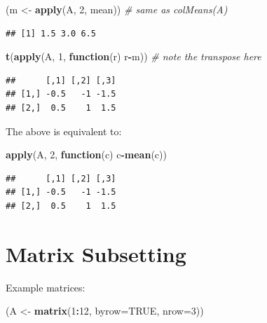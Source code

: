 \documentclass[10pt,b5paper,krantz1]{krantz}
\newenvironment{Shaded}{\begin{snugshade}}{\end{snugshade}}
\newcommand{\CommentTok}[1]{\textcolor[rgb]{0.37,0.37,0.37}{\textit{#1}}}
\newcommand{\ControlFlowTok}[1]{\textcolor[rgb]{0.27,0.27,0.27}{\textbf{#1}}}
\newcommand{\DataTypeTok}[1]{\textcolor[rgb]{0.27,0.27,0.27}{#1}}
\newcommand{\DecValTok}[1]{\textcolor[rgb]{0.06,0.06,0.06}{#1}}
\newcommand{\KeywordTok}[1]{\textcolor[rgb]{0.27,0.27,0.27}{\textbf{#1}}}
\newcommand{\NormalTok}[1]{#1}
\newcommand{\OperatorTok}[1]{\textcolor[rgb]{0.43,0.43,0.43}{\textbf{#1}}}
\newcommand{\OtherTok}[1]{\textcolor[rgb]{0.37,0.37,0.37}{#1}}
\newcommand{\StringTok}[1]{\textcolor[rgb]{0.5,0.5,0.5}{#1}}
\begin{document}
\begin{Shaded}
\begin{Highlighting}[]
\NormalTok{(m <-}\StringTok{ }\KeywordTok{apply}\NormalTok{(A, }\DecValTok{2}\NormalTok{, mean)) }\CommentTok{# same as colMeans(A)}
\end{Highlighting}
\end{Shaded}

\begin{verbatim}
## [1] 1.5 3.0 6.5
\end{verbatim}

\begin{Shaded}
\begin{Highlighting}[]
\KeywordTok{t}\NormalTok{(}\KeywordTok{apply}\NormalTok{(A, }\DecValTok{1}\NormalTok{, }\ControlFlowTok{function}\NormalTok{(r) r}\OperatorTok{-}\NormalTok{m)) }\CommentTok{# note the transpose here}
\end{Highlighting}
\end{Shaded}

\begin{verbatim}
##      [,1] [,2] [,3]
## [1,] -0.5   -1 -1.5
## [2,]  0.5    1  1.5
\end{verbatim}

The above is equivalent to:

\begin{Shaded}
\begin{Highlighting}[]
\KeywordTok{apply}\NormalTok{(A, }\DecValTok{2}\NormalTok{, }\ControlFlowTok{function}\NormalTok{(c) c}\OperatorTok{-}\KeywordTok{mean}\NormalTok{(c))}
\end{Highlighting}
\end{Shaded}

\begin{verbatim}
##      [,1] [,2] [,3]
## [1,] -0.5   -1 -1.5
## [2,]  0.5    1  1.5
\end{verbatim}

\hypertarget{matrix-subsetting}{%
\section{Matrix Subsetting}\label{matrix-subsetting}}

Example matrices:

\begin{Shaded}
\begin{Highlighting}[]
\NormalTok{(A <-}\StringTok{ }\KeywordTok{matrix}\NormalTok{(}\DecValTok{1}\OperatorTok{:}\DecValTok{12}\NormalTok{, }\DataTypeTok{byrow=}\OtherTok{TRUE}\NormalTok{, }\DataTypeTok{nrow=}\DecValTok{3}\NormalTok{))}
\end{Highlighting}
\end{Shaded}
\end{document}
